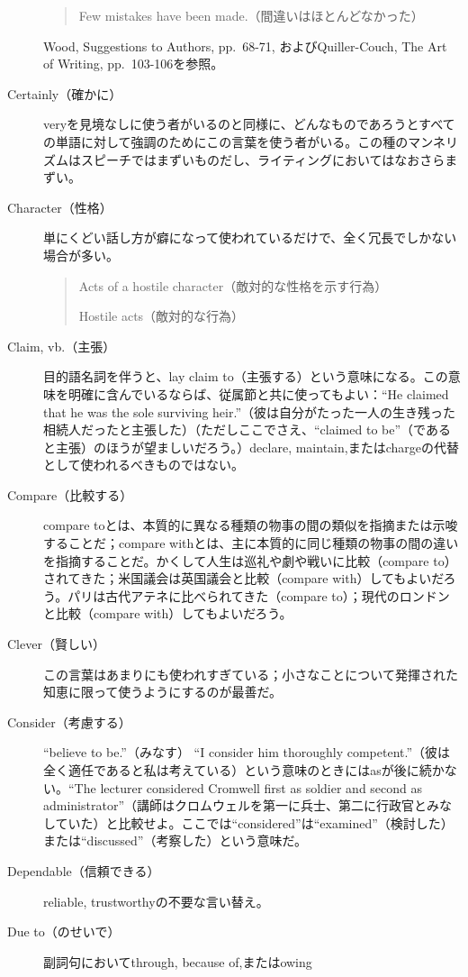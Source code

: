 \begin{description}
\begin{quote}
    Few mistakes have been made.（間違いはほとんどなかった）
\end{quote}
Wood, Suggestions to Authors, pp.~68-71, およびQuiller-Couch, The
Art of Writing, pp.~103-106を参照。
\item [Certainly（確かに）]
veryを見境なしに使う者がいるのと同様に、どんなものであろうとすべての単語に対して強調のためにこの言葉を使う者がいる。この種のマンネリズムはスピーチではまずいものだし、ライティングにおいてはなおさらまずい。
\item [Character（性格）]
単にくどい話し方が癖になって使われているだけで、全く冗長でしかない場合が多い。
\begin{quote}
    Acts of a hostile character（敵対的な性格を示す行為）
    
    Hostile acts（敵対的な行為）
\end{quote}
\item[Claim, vb.（主張）]目的語名詞を伴うと、lay claim
to（主張する）という意味になる。この意味を明確に含んでいるならば、従属節と共に使ってもよい：``He
claimed that he was the sole surviving
heir.''（彼は自分がたった一人の生き残った相続人だったと主張した）（ただしここでさえ、``claimed
to be''（であると主張）のほうが望ましいだろう。）declare,
maintain,またはchargeの代替として使われるべきものではない。
\item [Compare（比較する）]compare
toとは、本質的に異なる種類の物事の間の類似を指摘または示唆することだ；compare
withとは、主に本質的に同じ種類の物事の間の違いを指摘することだ。かくして人生は巡礼や劇や戦いに比較（compare
to）されてきた；米国議会は英国議会と比較（compare
with）してもよいだろう。パリは古代アテネに比べられてきた（compare
to）；現代のロンドンと比較（compare with）してもよいだろう。
\item [Clever（賢しい）]
この言葉はあまりにも使われすぎている；小さなことについて発揮された知恵に限って使うようにするのが最善だ。
\item[Consider（考慮する）]``believe to be.''（みなす） ``I consider him thoroughly
competent.''（彼は全く適任であると私は考えている）という意味のときにはasが後に続かない。``The
lecturer considered Cromwell first as soldier and second as
administrator''（講師はクロムウェルを第一に兵士、第二に行政官とみなしていた）と比較せよ。ここでは``considered''は``examined''（検討した）または``discussed''（考察した）という意味だ。
\item [Dependable（信頼できる）]reliable, trustworthyの不要な言い替え。
\item [Due to（のせいで）] 副詞句においてthrough, because of,またはowing

\end{description}
